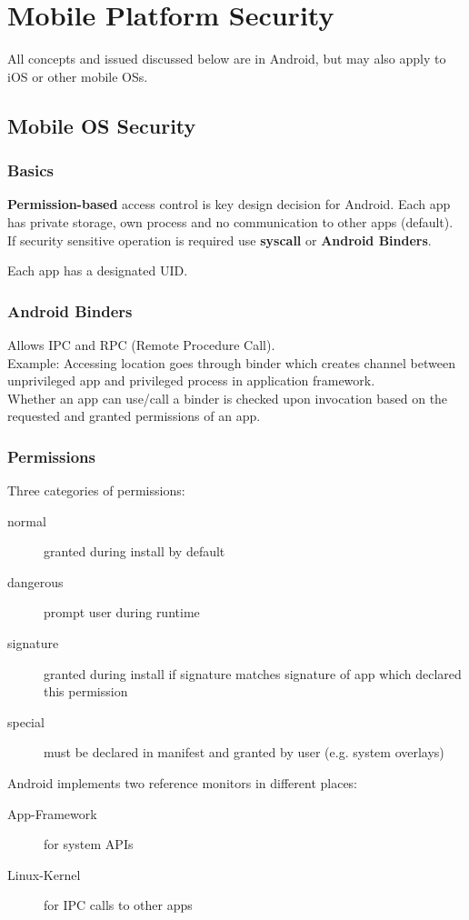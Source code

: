 \section{Mobile Platform Security}
All concepts and issued discussed below are in Android, but may also apply to iOS or other mobile OSs.
\subsection{Mobile OS Security}
\subsubsection{Basics}
\textbf{Permission-based} access control is key design decision for Android.
Each app has private storage, own process and no communication to other apps (default). If security sensitive operation is required use \textbf{syscall} or \textbf{Android Binders}.

Each app has a designated UID.

\subsubsection{Android Binders}
Allows IPC and RPC (Remote Procedure Call).\\
Example: Accessing location goes through binder which creates channel between unprivileged app and privileged process in application framework.\\
Whether an app can use/call a binder is checked upon invocation based on the requested and granted permissions of an app.
\subsubsection{Permissions}
Three categories of permissions:\vspace{-1.5mm}
\begin{description}
    \item[normal] granted during install by default
    \item[dangerous] prompt user during runtime
    \item[signature] granted during install if signature matches signature of app which declared this permission
    \item[special] must be declared in manifest and granted by user (e.g. system overlays)
\end{description}

Android implements two reference monitors in different places:
\begin{description}
    \item[App-Framework] for system APIs
    \item[Linux-Kernel] for IPC calls to other apps
\end{description}

